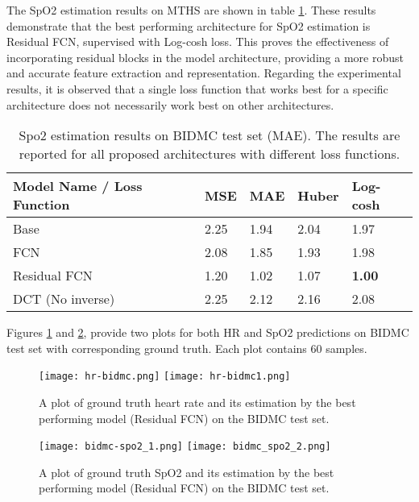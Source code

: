 \documentclass[conference]{IEEEtran}
\begin{document}
The SpO2 estimation results on MTHS are shown in table \ref{table:BIDMC-MAE-spo2}. These results demonstrate that the best performing architecture for SpO2 estimation is Residual FCN, supervised with Log-cosh loss. This proves the effectiveness of incorporating residual blocks in the model architecture, providing a more robust and accurate feature extraction and representation. Regarding the experimental results, it is observed that a single loss function that works best for a specific architecture does not necessarily work best on other architectures. 

\begin{table}[h]
\caption{Spo2 estimation results on BIDMC test set (MAE). The results are reported for all proposed architectures with different loss functions.}
\label{table:BIDMC-MAE-spo2}
\begin{tabular}{lllll}
\toprule
Model Name / Loss Function & MSE  & MAE  & Huber & Log-cosh \\ \hline
Base                     & 2.25 & 1.94  & 2.04  & 1.97     \\
FCN                      & 2.08 & 1.85  & 1.93  & 1.98     \\
Residual FCN            & 1.20 & 1.02 & 1.07 & \textbf{1.00}     \\
DCT (No inverse)        & 2.25 & 2.12 & 2.16  & 2.08    \\
\bottomrule
\end{tabular}
\end{table}

Figures \ref{fig:BIDMC-pred-hr} and \ref{fig:BIDMC-pred-spo2}, provide two plots for both HR and SpO2 predictions on BIDMC test set with corresponding ground truth. Each plot contains 60 samples.

\begin{figure}[htbp]
    \centering
    \texttt{[image: hr-bidmc.png]}
    \texttt{[image: hr-bidmc1.png]}
    \caption{A plot of ground truth heart rate and its estimation by the best performing model (Residual FCN) on the BIDMC test set.}
    \label{fig:BIDMC-pred-hr}
\end{figure}

\begin{figure}[htbp]
    \centering
    \texttt{[image: bidmc-spo2\_1.png]}
    \texttt{[image: bidmc\_spo2\_2.png]}
    \caption{A plot of ground truth SpO2 and its estimation by the best performing model (Residual FCN) on the BIDMC test set.}
    \label{fig:BIDMC-pred-spo2}
\end{figure}
\end{document}
